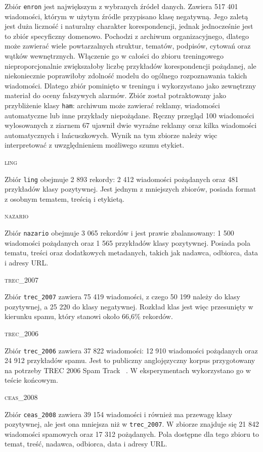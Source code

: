 Zbiór \texttt{enron} jest największym z wybranych źródeł danych.
Zawiera 517 401 wiadomości, którym w użytym źródle przypisano klasę negatywną.
Jego zaletą jest duża liczność i naturalny charakter korespondencji,
jednak jednocześnie jest to zbiór specyficzny domenowo. Pochodzi z archiwum
organizacyjnego, dlatego może zawierać wiele powtarzalnych struktur, tematów,
podpisów, cytowań oraz wątków wewnętrznych. Włączenie go w całości do zbioru
treningowego nieproporcjonalnie zwiększałoby liczbę przykładów korespondencji
pożądanej, ale niekoniecznie poprawiłoby zdolność modelu do ogólnego
rozpoznawania takich wiadomości. Dlatego zbiór pominięto w treningu i
wykorzystano jako zewnętrzny materiał do oceny fałszywych alarmów. Zbiór został
potraktowany jako przybliżenie klasy \texttt{ham}: archiwum może zawierać
reklamy, wiadomości automatyczne lub inne przykłady niepożądane. Ręczny
przegląd 100 wiadomości wylosowanych z ziarnem 67 ujawnił dwie wyraźne reklamy oraz
kilka wiadomości automatycznych i łańcuszkowych. Wynik na tym zbiorze należy
więc interpretować z uwzględnieniem możliwego szumu etykiet.

\textsc{ling}

Zbiór \texttt{ling} obejmuje 2 893 rekordy: 2 412 wiadomości pożądanych oraz
481 przykładów klasy pozytywnej. Jest jednym z mniejszych zbiorów, posiada
format z osobnym tematem, treścią i etykietą.

\textsc{nazario}

Zbiór \texttt{nazario} obejmuje 3 065 rekordów i jest prawie zbalansowany:
1 500 wiadomości pożądanych oraz 1 565 przykładów klasy pozytywnej. Posiada
pola tematu, treści oraz dodatkowych metadanych, takich jak nadawca,
odbiorca, data i adresy URL.

\textsc{trec\_2007}

Zbiór \texttt{trec\_2007} zawiera 75 419 wiadomości, z czego 50 199 należy do
klasy pozytywnej, a 25 220 do klasy negatywnej. Rozkład klas jest więc
przesunięty w kierunku spamu, który stanowi około 66,6\% rekordów.

\textsc{trec\_2006}

Zbiór \texttt{trec\_2006} zawiera 37 822 wiadomości: 12 910 wiadomości
pożądanych oraz 24 912 przykładów spamu. Jest to publiczny anglojęzyczny
korpus przygotowany na potrzeby TREC 2006 Spam Track
~\autocite{cormack-trec-2006-spam-track}. W eksperymentach wykorzystano go
w teście końcowym.

\textsc{ceas\_2008}

Zbiór \texttt{ceas\_2008} zawiera 39 154 wiadomości i również ma przewagę klasy
pozytywnej, ale jest ona mniejsza niż w \texttt{trec\_2007}. W zbiorze znajduje
się 21 842 wiadomości spamowych oraz 17 312 pożądanych. Pola dostępne dla tego zbioru to
temat, treść, nadawca, odbiorca, data i adresy URL.

